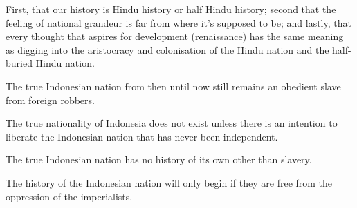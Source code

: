 First, that our history is Hindu history or half Hindu history; second 
that the feeling of national grandeur is far from where it's supposed to be; and 
lastly, that every thought that aspires for development (renaissance) has the same 
meaning as digging into the aristocracy and colonisation of the Hindu nation and the half-buried Hindu nation.\vskip 0.2in

The true Indonesian nation from then until now still remains an obedient slave from foreign robbers.\vskip 0.2in

The true nationality of Indonesia does not exist unless there is an intention to liberate the Indonesian nation that has never been independent.\vskip 0.2in

The true Indonesian nation has no history of its own other than slavery.\vskip 0.2in

The history of the Indonesian nation will only begin if they are free from the oppression of the imperialists.